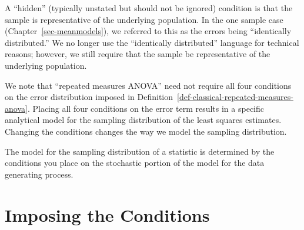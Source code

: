 \documentclass[
  letterpaper,
  DIV=11,
  numbers=noendperiod]{scrreprt}
\theoremstyle{definition}
\theoremstyle{definition}
\theoremstyle{plain}
\theoremstyle{remark}
\begin{document}
\begin{tcolorbox}[enhanced jigsaw, colbacktitle=quarto-callout-warning-color!10!white, colback=white, left=2mm, title=\textcolor{quarto-callout-warning-color}{\faExclamationTriangle}\hspace{0.5em}{Warning}, toptitle=1mm, leftrule=.75mm, breakable, bottomrule=.15mm, arc=.35mm, rightrule=.15mm, toprule=.15mm, coltitle=black, opacityback=0, colframe=quarto-callout-warning-color-frame, opacitybacktitle=0.6, bottomtitle=1mm, titlerule=0mm]

A ``hidden'' (typically unstated but should not be ignored) condition is
that the sample is representative of the underlying population. In the
one sample case (Chapter~\ref{sec-meanmodels}), we referred to this as
the errors being ``identically distributed.'' We no longer use the
``identically distributed'' language for technical reasons; however, we
still require that the sample be representative of the underlying
population.

\end{tcolorbox}

We note that ``repeated measures ANOVA'' need not require all four
conditions on the error distribution imposed in
Definition~\ref{def-classical-repeated-measures-anova}. Placing all four
conditions on the error term results in a specific analytical model for
the sampling distribution of the least squares estimates. Changing the
conditions changes the way we model the sampling distribution.

\begin{tcolorbox}[enhanced jigsaw, colbacktitle=quarto-callout-tip-color!10!white, colback=white, left=2mm, title=\textcolor{quarto-callout-tip-color}{\faLightbulb}\hspace{0.5em}{Big Idea}, toptitle=1mm, leftrule=.75mm, breakable, bottomrule=.15mm, arc=.35mm, rightrule=.15mm, toprule=.15mm, coltitle=black, opacityback=0, colframe=quarto-callout-tip-color-frame, opacitybacktitle=0.6, bottomtitle=1mm, titlerule=0mm]

The model for the sampling distribution of a statistic is determined by
the conditions you place on the stochastic portion of the model for the
data generating process.

\end{tcolorbox}

\section{Imposing the Conditions}\label{imposing-the-conditions-2}
\end{document}
